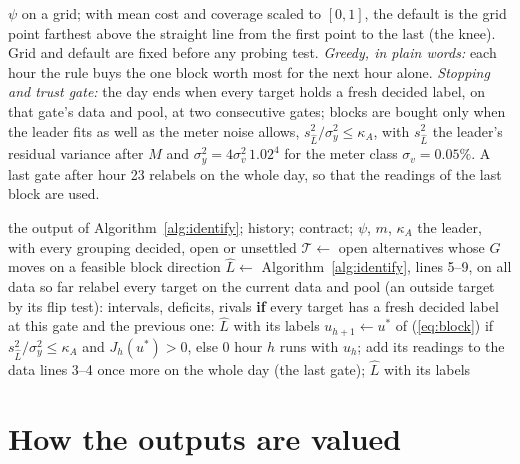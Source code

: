 \documentclass[journal,onecolumn,11pt]{IEEEtran}
\newcommand{\Tset}{\mathcal{T}}
\begin{document}
$\psi$ on a grid; with mean cost and coverage scaled to $[0,1]$, the default is the grid point farthest above the straight
line from the first point to the last (the knee). Grid and default are fixed before any probing test. \emph{Greedy, in plain
words:} each hour the rule buys the one block worth most for the next hour alone. \emph{Stopping and trust gate:} the day
ends when every target holds a fresh decided label, on that gate's data and pool, at two consecutive gates; blocks are
bought only when the leader fits as well as the meter noise allows, $s^2_{\hat L}/\sigma^2_y\le\kappa_A$, with $s^2_{\hat L}$ the
leader's residual variance after $M$ and $\sigma^2_y=4\sigma_v^2\,1.02^4$ for the meter class $\sigma_v=0.05\%$. A last gate after
hour 23 relabels on the whole day, so that the readings of the last block are used.

\begin{algorithm}[t]
\caption{\textsc{Probe}: one day of cost-aware probing (proposed)}\label{alg:probe}
\begin{algorithmic}[1]
\Require the output of Algorithm~\ref{alg:identify}; history; contract; $\psi$, $m$, $\kappa_A$
\Ensure the leader, with every grouping decided, open or unsettled
\State $\Tset\gets$ open alternatives whose $G$ moves on a feasible block direction 
 
  \State $\hat L\gets$ Algorithm~\ref{alg:identify}, lines 5--9, on all data so far
  \State relabel every target on the current data and pool (an outside target by its flip test): intervals, deficits, rivals
  \State \textbf{if} every target has a fresh decided label at this gate and the previous one: \Return $\hat L$ with its labels
  \State $u_{h+1}\gets u^\ast$ of (\ref{eq:block}) if $s^2_{\hat L}/\sigma^2_y\le\kappa_A$ and $J_h(u^\ast)>0$, else $0$
  \State hour $h$ runs with $u_h$; add its readings to the data
\EndFor
\State lines 3--4 once more on the whole day (the last gate); \Return $\hat L$ with its labels 
\end{algorithmic}
\end{algorithm}

\section{How the outputs are valued}\label{sec:value}
\end{document}
